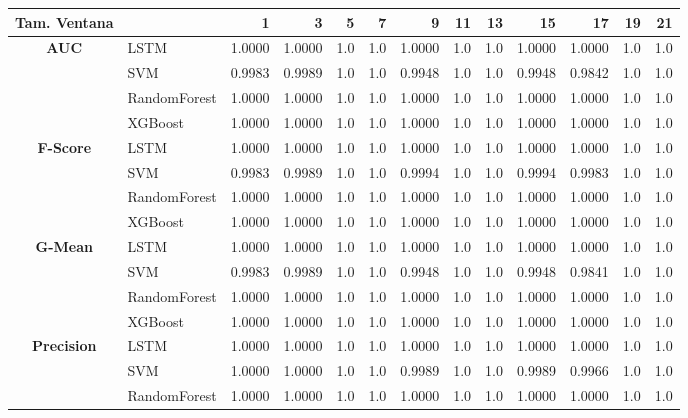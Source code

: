 \begin{table}[h]
	\centering
	\begin{adjustbox}{max width=15cm}
		\begin{tabular}{|c|l|r|r|r|r|r|r|r|r|r|r|r|}
			\hline
			\textbf{Tam. Ventana}&         &      1  &      3  &   5  &   7  &      9  &   11 &   13 &      15 &      17 &   19 &   21 \\
			\hline
			\textbf{AUC} & LSTM &  1.0000 &  1.0000 &  1.0 &  1.0 &  1.0000 &  1.0 &  1.0 &  1.0000 &  1.0000 &  1.0 &  1.0 \\
			& SVM &  0.9983 &  0.9989 &  1.0 &  1.0 &  0.9948 &  1.0 &  1.0 &  0.9948 &  0.9842 &  1.0 &  1.0 \\
			& RandomForest &  1.0000 &  1.0000 &  1.0 &  1.0 &  1.0000 &  1.0 &  1.0 &  1.0000 &  1.0000 &  1.0 &  1.0 \\
			& XGBoost &  1.0000 &  1.0000 &  1.0 &  1.0 &  1.0000 &  1.0 &  1.0 &  1.0000 &  1.0000 &  1.0 &  1.0 \\
			\hline
			\textbf{F-Score} & LSTM &  1.0000 &  1.0000 &  1.0 &  1.0 &  1.0000 &  1.0 &  1.0 &  1.0000 &  1.0000 &  1.0 &  1.0 \\
			& SVM &  0.9983 &  0.9989 &  1.0 &  1.0 &  0.9994 &  1.0 &  1.0 &  0.9994 &  0.9983 &  1.0 &  1.0 \\
			& RandomForest &  1.0000 &  1.0000 &  1.0 &  1.0 &  1.0000 &  1.0 &  1.0 &  1.0000 &  1.0000 &  1.0 &  1.0 \\
			& XGBoost &  1.0000 &  1.0000 &  1.0 &  1.0 &  1.0000 &  1.0 &  1.0 &  1.0000 &  1.0000 &  1.0 &  1.0 \\
			\hline
			\textbf{G-Mean} & LSTM &  1.0000 &  1.0000 &  1.0 &  1.0 &  1.0000 &  1.0 &  1.0 &  1.0000 &  1.0000 &  1.0 &  1.0 \\
			& SVM &  0.9983 &  0.9989 &  1.0 &  1.0 &  0.9948 &  1.0 &  1.0 &  0.9948 &  0.9841 &  1.0 &  1.0 \\
			& RandomForest &  1.0000 &  1.0000 &  1.0 &  1.0 &  1.0000 &  1.0 &  1.0 &  1.0000 &  1.0000 &  1.0 &  1.0 \\
			& XGBoost &  1.0000 &  1.0000 &  1.0 &  1.0 &  1.0000 &  1.0 &  1.0 &  1.0000 &  1.0000 &  1.0 &  1.0 \\
			\hline
			\textbf{Precision} & LSTM &  1.0000 &  1.0000 &  1.0 &  1.0 &  1.0000 &  1.0 &  1.0 &  1.0000 &  1.0000 &  1.0 &  1.0 \\
			& SVM &  1.0000 &  1.0000 &  1.0 &  1.0 &  0.9989 &  1.0 &  1.0 &  0.9989 &  0.9966 &  1.0 &  1.0 \\
			& RandomForest &  1.0000 &  1.0000 &  1.0 &  1.0 &  1.0000 &  1.0 &  1.0 &  1.0000 &  1.0000 &  1.0 &  1.0 \\

\end{tabular}
\end{adjustbox}
\end{table}
